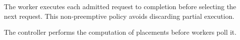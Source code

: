 The worker executes each admitted request to completion before selecting the
next request. This non-preemptive policy avoids discarding partial execution.

The controller performs the computation of placements before workers poll it.

